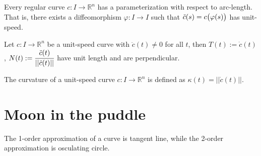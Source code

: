 \documentclass[10pt]{article}
\begin{document}
            \begin{proposition}
                Every regular curve $c: I\rightarrow\mathbb{R}^n$ has a parameterization with respect to arc-length. That is, there exists a diffeomorphism $\varphi: I\rightarrow I$ such that $\Tilde{c}(s) = c\big(\varphi(s)\big)$ has unit-speed.
            \end{proposition}
            \begin{theorem}
                Let $c: I\rightarrow\mathbb{R}^n$ be a unit-speed curve with $\ddot{c}(t)\neq 0$ for all $t$, then $T(t) := \dot{c}(t)$, $N(t) := \cfrac{\ddot{c}(t)}{||\ddot{c}(t)||}$ have unit length and are perpendicular.
            \end{theorem}
            \begin{definition}[Curvature]
                The curvature of a unit-speed curve $c: I\rightarrow\mathbb{R}^n$ is defined as $\kappa(t) = ||\dot{c}(t)||$.
            \end{definition}


        \section{Moon in the puddle}
            The 1-order approximation of a curve is tangent line, while the 2-order approximation is osculating circle.
\end{document}
